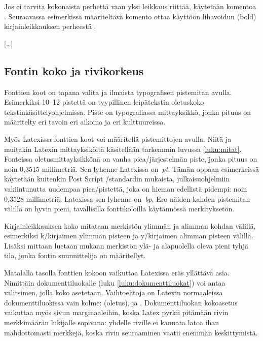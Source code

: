Jos ei tarvita kokonaista perhettä vaan yksi leikkaus riittää, käytetään
komentoa . Seuraavassa esimerkissä
määriteltävä komento  ottaa käyttöön
lihavoidun (bold) kirjainleikkauksen perheestä .

\begin{koodilohkosis}
  […]
\end{koodilohkosis}

\subsection{Fontin koko ja rivikorkeus}

Fonttien koot on tapana valita ja ilmaista typografisen pistemitan
avulla. Esimerkiksi 10--12 pistettä on tyypillinen leipätekstin
oletuskoko teks\-tin\-kä\-sit\-tely\-ohjel\-mis\-sa. Piste on
typografiassa mitta\-yksikkö, jonka pituus on määritelty eri tavoin eri
aikoina ja eri kulttuureissa.

Myös Latexissa fonttien koot voi määritellä pistemittojen avulla. Niitä
ja muitakin Latexin mit\-ta\-yk\-si\-köi\-tä käsitellään tarkemmin
luvussa \ref{luku:mitat}. Fonteissa ole\-tus\-mitta\-yk\-sik\-kö\-nä on
vanha pica\-/järjestelmän piste, jonka pituus on noin 0,3515
millimetriä. Sen lyhenne Latexissa on~\emph{pt}. Tämän oppaan
esimerkeissä käytetään kuitenkin Post Script \=/standardin mukaista,
julkaisuohjelmiin vakiintunutta uudempaa pica\-/pistettä, joka on hieman
edellistä pidempi: noin 0,3528 millimetriä. Latexissa sen lyhenne
on~\emph{bp}. Ero näiden kahden pistemitan välillä on hyvin pieni,
tavallisilla fonttiko'oilla käytännössä merkityksetön.

Kirjainleikkauksen koko mitataan merkistön ylimmän ja alimman kohdan
välillä, esimerkiksi k\=/kirjaimen ylimmän pisteen ja y\=/kirjaimen
alimman pisteen välillä. Lisäksi mittaan luetaan mukaan merkistön ylä-
ja alapuolella oleva pieni tyhjä tila, jonka fontin suunnittelija on
määritellyt.

Matalalla tasolla fonttien kokoon vaikuttaa Latexissa eräs yllättävä
asia. Nimittäin dokumenttiluokalle (luku \ref{luku:dokumenttiluokat})
voi antaa valitsimen, jolla koko asetetaan. Vaihtoehtoja on Latexin
normaaleissa dokumenttiluokissa vain kolme: \koodi{10pt} (oletus),
\koodi{11pt} ja \koodi{12pt}. Dokumenttiluokan koko\-asetus vaikuttaa
myös sivun marginaaleihin, koska Latex pyrkii pitämään rivin
merkkimäärän lukijalle sopivana: yhdelle riville ei kannata latoa ihan
mahdottomasti merkkejä, koska rivin seuraaminen vaatii enemmän
keskittymistä.

